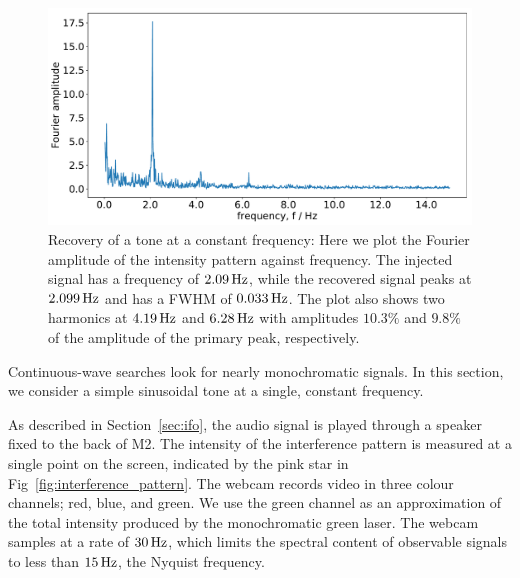 \documentclass[paper-main.tex]{subfiles}
\begin{document}
\begin{figure}
	\includegraphics[width=.49\textwidth]{figures/webcam_expt_4_0209-cropped.pdf}
	\caption{\label{fig:webcam_spectrum}
Recovery of a tone at a constant frequency: Here we plot the Fourier amplitude of the intensity pattern against frequency.
The injected signal has a frequency of $2.09\,{\rm Hz}$, while the recovered signal peaks at $2.099\,{\rm Hz}$ and has a FWHM of $0.033\,{\rm Hz}$.
The plot also shows two harmonics at $4.19\,{\rm Hz}$ and $6.28\,{\rm Hz}$ with amplitudes $10.3 \%$ and $9.8 \%$ of the amplitude of the primary peak, respectively.
}	
\end{figure}


Continuous-wave searches look for nearly monochromatic signals. In this section, we consider a simple sinusoidal tone at a single, constant frequency. %

As described in Section~\ref{sec:ifo}, the audio signal is played through a speaker fixed to the back of M2. 
The intensity of the interference pattern is measured at a single point on the screen, indicated by the pink star in Fig~\ref{fig:interference_pattern}. 
The webcam records video in three colour channels; red, blue, and green. 
We use the green channel as an approximation of the total intensity produced by the monochromatic green laser.
The webcam samples at a rate of $30\, {\rm Hz}$, which limits the spectral content of observable signals to less than $15\,{\rm Hz}$, the Nyquist frequency. 


\end{document}

